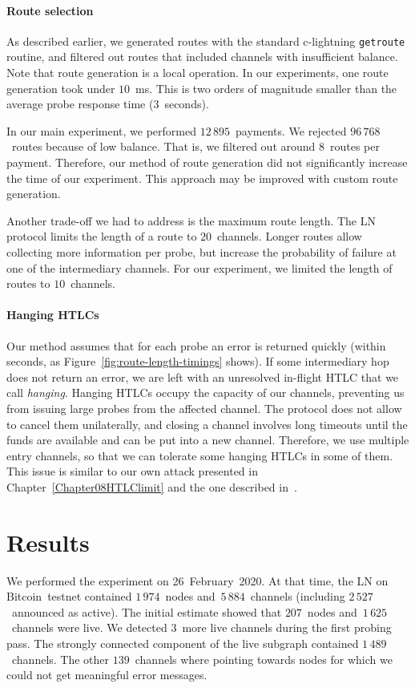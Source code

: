 \paragraph{Route selection}
As described earlier, we generated routes with the standard c-lightning \texttt{getroute} routine, and filtered out routes that included channels with insufficient balance.
Note that route generation is a local operation.
In our experiments, one route generation took under $10$~ms.
This is two orders of magnitude smaller than the average probe response time ($3$~seconds).

In our main experiment, we performed $12\,895$~payments.
We rejected $96\,768$~routes because of low balance.
That is, we filtered out around $8$~routes per payment.
Therefore, our method of route generation did not significantly increase the time of our experiment.
This approach may be improved with custom route generation.

Another trade-off we had to address is the maximum route length.
The LN protocol limits the length of a route to $20$~channels.
Longer routes allow collecting more information per probe, but increase the probability of failure at one of the intermediary channels.
For our experiment, we limited the length of routes to $10$~channels.

\paragraph{Hanging HTLCs}
Our method assumes that for each probe an error is returned quickly (within seconds, as Figure~\ref{fig:route-length-timings} shows).
If some intermediary hop does not return an error, we are left with an unresolved in-flight HTLC that we call \textit{hanging}.
Hanging HTLCs occupy the capacity of our channels, preventing us from issuing large probes from the affected channel.
The protocol does not allow to cancel them unilaterally, and closing a channel involves long timeouts until the funds are available and can be put into a new channel.
Therefore, we use multiple entry channels, so that we can tolerate some hanging HTLCs in some of them.
This issue is similar to our own attack presented in Chapter~\ref{Chapter08HTLClimit} and the one described in~\cite{Mizrahi2020}.


\section{Results} \label{sec:results}

We performed the experiment on 26~February~2020.
At that time, the LN on Bitcoin~testnet contained $1\,974$~nodes and~$5\,884$~channels (including $2\,527$~announced as active).
The initial estimate showed that $207$~nodes and~$1\,625$~channels were live.
We detected $3$~more live channels during the first probing pass.
The strongly connected component of the live subgraph contained $1\,489$~channels.
The other $139$~channels where pointing towards nodes for which we could not get meaningful error messages.

